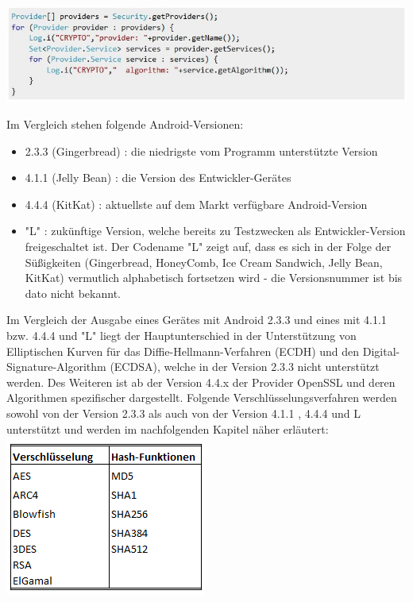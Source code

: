 \documentclass[10pt, a4paper,headsepline]{scrreprt}
\begin{document}
\begin{center}
\includegraphics[scale=0.8]{read_cryptoprovider.JPG} 
\end{center}
Im Vergleich stehen folgende Android-Versionen:
\begin{itemize}
\item 2.3.3 (Gingerbread) : die niedrigste vom Programm unterstützte Version
\item 4.1.1 (Jelly Bean) : die Version des Entwickler-Gerätes
\item 4.4.4 (KitKat) : aktuellste auf dem Markt verfügbare Android-Version
\item "L" : zukünftige Version, welche bereits zu Testzwecken als Entwickler-Version freigeschaltet ist. Der Codename "L" zeigt auf, dass es sich in der Folge der Süßigkeiten (Gingerbread, HoneyComb, Ice Cream Sandwich, Jelly Bean, KitKat) vermutlich alphabetisch fortsetzen wird - die Versionsnummer ist bis dato nicht bekannt.
\end{itemize}
Im Vergleich der Ausgabe eines Gerätes mit Android 2.3.3 und eines mit 4.1.1 bzw. 4.4.4 und "L" liegt der Hauptunterschied in der Unterstützung von Elliptischen Kurven für das Diffie-Hellmann-Verfahren (ECDH) und den Digital-Signature-Algorithm (ECDSA), welche in der Version 2.3.3 nicht unterstützt werden. Des Weiteren ist ab der Version 4.4.x der Provider OpenSSL und deren Algorithmen spezifischer dargestellt.
Folgende Verschlüsselungsverfahren werden sowohl von der Version 2.3.3 als auch von der Version 4.1.1 , 4.4.4 und L unterstützt und werden im nachfolgenden Kapitel näher erläutert: \\

\includegraphics[scale=1.0]{vorh_crypto.PNG}
\hfill
\end{document}
